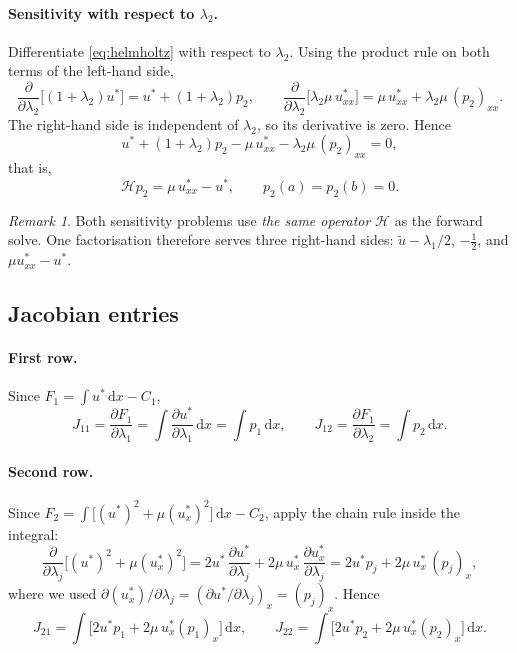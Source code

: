 \documentclass[11pt,a4paper]{article}
\theoremstyle{remark}
\newtheorem{remark}{Remark}
\newcommand{\dx}{\,\mathrm{d}x}
\newcommand{\ut}{\tilde{u}}
\newcommand{\us}{u^{*}}
\begin{document}
\paragraph{Sensitivity with respect to $\lambda_2$.}
Differentiate \eqref{eq:helmholtz} with respect to $\lambda_2$. Using the product
rule on both terms of the left-hand side,
\begin{equation}
\frac{\partial}{\partial\lambda_2}\Big[(1+\lambda_2)\us\Big]
= \us + (1+\lambda_2)p_2,
\qquad
\frac{\partial}{\partial\lambda_2}\Big[\lambda_2\mu\,\us_{xx}\Big]
= \mu\,\us_{xx} + \lambda_2\mu\,(p_2)_{xx}.
\end{equation}
The right-hand side is independent of $\lambda_2$, so its derivative is zero.
Hence
\begin{equation}
\us + (1+\lambda_2)p_2 - \mu\,\us_{xx} - \lambda_2\mu\,(p_2)_{xx} = 0,
\end{equation}
that is,
\begin{equation}
\boxed{\ \mathcal{H}p_2 = \mu\,\us_{xx} - \us, \qquad p_2(a) = p_2(b) = 0. \ }
\label{eq:p2}
\end{equation}

\begin{remark}
Both sensitivity problems use \emph{the same operator} $\mathcal{H}$ as the
forward solve. One factorisation therefore serves three right-hand sides:
$\ut - \lambda_1/2$, $-\tfrac12$, and $\mu\us_{xx}-\us$.
\end{remark}

\subsection{Jacobian entries}

\paragraph{First row.} Since $F_1 = \int\us\dx - C_1$,
\begin{equation}
J_{11} = \frac{\partial F_1}{\partial\lambda_1}
= \int \frac{\partial \us}{\partial\lambda_1}\dx = \int p_1 \dx,
\qquad
J_{12} = \frac{\partial F_1}{\partial\lambda_2} = \int p_2 \dx .
\end{equation}

\paragraph{Second row.} Since $F_2 = \int\big[(\us)^2 + \mu(\us_x)^2\big]\dx - C_2$,
apply the chain rule inside the integral:
\begin{equation}
\frac{\partial}{\partial\lambda_j}\Big[(\us)^2 + \mu(\us_x)^2\Big]
= 2\us\,\frac{\partial\us}{\partial\lambda_j}
+ 2\mu\,\us_x\,\frac{\partial\us_x}{\partial\lambda_j}
= 2\us p_j + 2\mu\,\us_x\,(p_j)_x ,
\end{equation}
where we used $\partial(\us_x)/\partial\lambda_j = (\partial\us/\partial\lambda_j)_x = (p_j)_x$.
Hence
\begin{equation}
J_{21} = \int\Big[2\us p_1 + 2\mu\,\us_x (p_1)_x\Big]\dx,
\qquad
J_{22} = \int\Big[2\us p_2 + 2\mu\,\us_x (p_2)_x\Big]\dx .
\end{equation}
\end{document}
